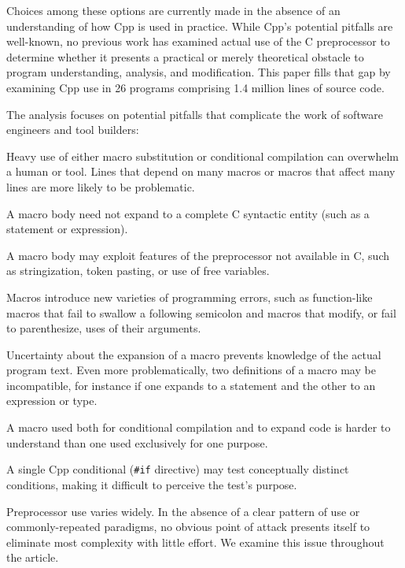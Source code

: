 \documentclass[10pt]{article}
\def\typeofdocument{article}    %
\def\numpackages{26}
\def\numlines{1.4 million}      %
\begin{document}
Choices among these options are currently made in the absence of
an understanding of how Cpp is used in practice.
While  Cpp's potential pitfalls are well-known, no
previous work has examined actual use of the C preprocessor to
determine whether it presents a practical or merely theoretical
obstacle to program understanding, analysis, and modification.  This
paper fills that gap by examining Cpp use in {\numpackages} programs
comprising {\numlines} lines of source code.

The analysis focuses on potential pitfalls that complicate the work of
software engineers and tool builders:
\begin{description}\itemsep 0pt \parskip 0pt
\item[high total use {\rm (Sections~\ref{sec:directives}, \ref{sec:macro-usage}, and~\ref{sec:dependence}):}]
  Heavy use of either macro substitution or conditional compilation can
  overwhelm a human or tool.  Lines that
  depend on many macros or macros that affect many lines are more
  likely to be problematic.
\item[complicated bodies {\rm (Section~\ref{sec:categorization}):}]
  A macro body need not expand to a complete C syntactic entity (such as a
  statement or expression).
\item[extra-linguistic features {\rm (Section~\ref{sec:extra-linguistic}):}]
  A macro body may exploit features of the preprocessor not available in C,
  such as stringization, token pasting, or use of free variables.
\item[macro pitfalls {\rm (Section~\ref{sec:lint}):}]
  Macros introduce new varieties of programming errors, such as
  function-like macros that fail to swallow a following semicolon and
  macros that modify, or fail to parenthesize, uses of their arguments.
\item[multiple definitions {\rm (Sections~\ref{sec:mult-def}--\ref{sec:inconsistent}):}]
  Uncertainty about the expansion of a macro prevents knowledge of the
  actual program text.  Even more problematically, two definitions of a
  macro may be incompatible, for instance if one expands to a statement and the
  other to an expression or type.
\item[inconsistent usage {\rm (Section~\ref{sec:inconsistent-usage}):}]
  A macro used both for conditional compilation and to expand code is
  harder to understand than one used exclusively for one purpose.
\item[mixed tests {\rm (Section~\ref{sec:ccd}):}]
  A single Cpp conditional ({\tt \#if} directive) may test conceptually
  distinct conditions, making it difficult to perceive the
  test's purpose.
\item[variation in use{\rm :}]
  Preprocessor use varies widely.
  In the absence of a clear pattern of use or commonly-repeated paradigms,
  no obvious point of attack presents itself to eliminate most complexity
  with little effort.  We examine this issue throughout the \typeofdocument.
\end{description}
\end{document}
